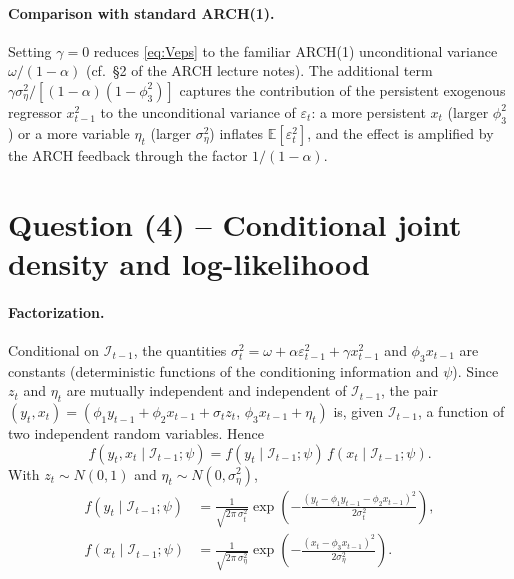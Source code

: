 \documentclass[12pt]{article}
\newcommand{\E}{\mathbb{E}}
\newcommand{\Info}{\mathcal{I}}
\begin{document}
\paragraph{Comparison with standard ARCH(1).} Setting $\gamma=0$ reduces \eqref{eq:Veps} to the familiar ARCH(1) unconditional variance $\omega/(1-\alpha)$ (cf.\ \S2 of the ARCH lecture notes). The additional term $\gamma\sigma_\eta^2/[(1-\alpha)(1-\phi_3^2)]$ captures the contribution of the persistent exogenous regressor $x_{t-1}^2$ to the unconditional variance of $\varepsilon_t$: a more persistent $x_t$ (larger $\phi_3^2$) or a more variable $\eta_t$ (larger $\sigma_\eta^2$) inflates $\E[\varepsilon_t^2]$, and the effect is amplified by the ARCH feedback through the factor $1/(1-\alpha)$.

\section*{Question (4) -- Conditional joint density and log-likelihood}

\paragraph{Factorization.} Conditional on $\Info_{t-1}$, the quantities $\sigma_t^2=\omega+\alpha\varepsilon_{t-1}^2+\gamma x_{t-1}^2$ and $\phi_3 x_{t-1}$ are constants (deterministic functions of the conditioning information and $\psi$). Since $z_t$ and $\eta_t$ are mutually independent and independent of $\Info_{t-1}$, the pair $(y_t,x_t)=(\phi_1 y_{t-1}+\phi_2 x_{t-1}+\sigma_t z_t,\,\phi_3 x_{t-1}+\eta_t)$ is, given $\Info_{t-1}$, a function of two independent random variables. Hence
\begin{equation}
f(y_t,x_t\mid\Info_{t-1};\psi) = f(y_t\mid\Info_{t-1};\psi)\,f(x_t\mid\Info_{t-1};\psi).\label{eq:factor}
\end{equation}
With $z_t\sim N(0,1)$ and $\eta_t\sim N(0,\sigma_\eta^2)$,
\begin{align}
f(y_t\mid\Info_{t-1};\psi)
&= \frac{1}{\sqrt{2\pi\,\sigma_t^2}}\exp\!\left(-\frac{(y_t-\phi_1 y_{t-1}-\phi_2 x_{t-1})^2}{2\sigma_t^2}\right),\label{eq:fy}\\
f(x_t\mid\Info_{t-1};\psi)
&= \frac{1}{\sqrt{2\pi\,\sigma_\eta^2}}\exp\!\left(-\frac{(x_t-\phi_3 x_{t-1})^2}{2\sigma_\eta^2}\right).\label{eq:fx}
\end{align}
\end{document}
